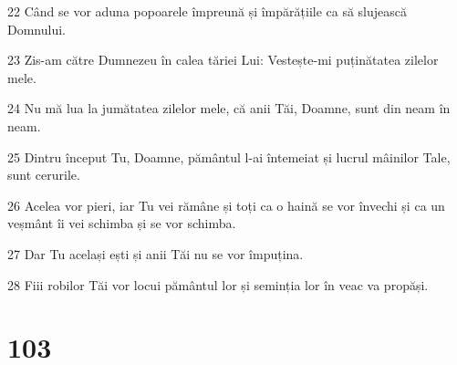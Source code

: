 \par 22 Când se vor aduna popoarele împreună și împărățiile ca să slujească Domnului.
\par 23 Zis-am către Dumnezeu în calea tăriei Lui: Vestește-mi puținătatea zilelor mele.
\par 24 Nu mă lua la jumătatea zilelor mele, că anii Tăi, Doamne, sunt din neam în neam.
\par 25 Dintru început Tu, Doamne, pământul l-ai întemeiat și lucrul mâinilor Tale, sunt cerurile.
\par 26 Acelea vor pieri, iar Tu vei rămâne și toți ca o haină se vor învechi și ca un veșmânt îi vei schimba și se vor schimba.
\par 27 Dar Tu același ești și anii Tăi nu se vor împuțina.
\par 28 Fiii robilor Tăi vor locui pământul lor și seminția lor în veac va propăși.

\chapter{103}

